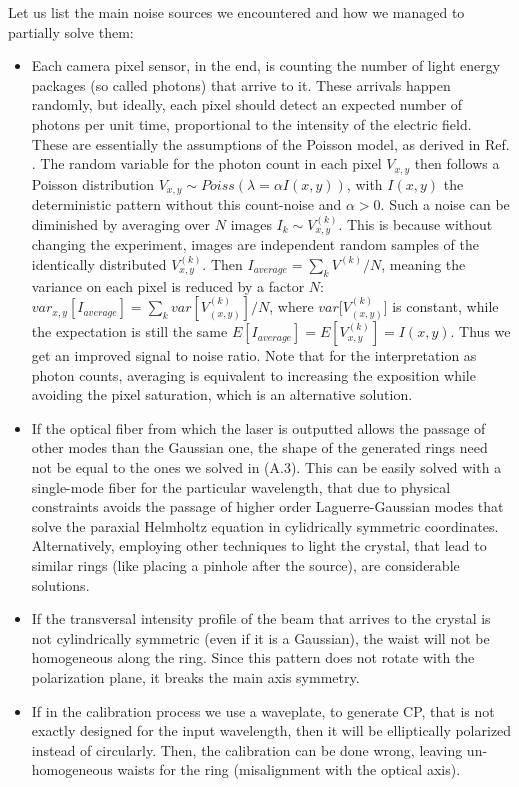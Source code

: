 \documentclass[11pt, a4paper, twoside]{article} %
\begin{document}
Let us list the main noise sources we encountered and how we managed to partially solve them:\vspace{-0.25cm}
\begin{itemize}
\item Each camera pixel sensor, in the end, is counting the number of light energy packages (so called photons) that arrive to it. These arrivals happen randomly, but ideally, each pixel should detect an expected number of photons per unit time, proportional to the intensity of the electric field. These are essentially the assumptions of the Poisson model, as derived in Ref. \cite{poisson}. The random variable for the photon count in each pixel $V_{x,y}$ then follows a Poisson distribution $V_{x,y}\sim Poiss(\lambda=\alpha I(x,y))$, with $I(x,y)$ the deterministic pattern without this count-noise and $\alpha>0$. Such a noise can be diminished by averaging over $N$ images $I_k\sim V^{(k)}_{x,y}$. This is because without changing the experiment, images are independent random samples of the identically distributed $V^{(k)}_{x,y}$. Then $I_{average}=\sum_{k}V^{(k)}/N$, meaning the variance on each pixel is reduced by a factor $N$: $var_{x,y}[I_{average}]=\sum_k var[V_{(x,y)}^{(k)}]/N$, where $var[V_{(x,y)}^{(k)}$] is constant, while the expectation is still the same $E[I_{average}]=E[V_{x,y}^{(k)}]=I(x,y)$. Thus we get an improved signal to noise ratio. Note that for the interpretation as photon counts, averaging is equivalent to increasing the exposition while avoiding the pixel saturation, which is an alternative solution.

\item If the optical fiber from which the laser is outputted allows the passage of other modes than the Gaussian one, the shape of the generated rings need not be equal to the ones we solved in (A.3). This can be easily solved with a single-mode fiber for the particular wavelength, that due to physical constraints avoids the passage of higher order Laguerre-Gaussian modes that solve the paraxial Helmholtz equation in cylidrically symmetric coordinates. Alternatively, employing other techniques to light the crystal, that lead to similar rings (like placing a pinhole after the source), are considerable solutions. \vspace{-0.1cm}

\item If the transversal intensity profile of the beam that arrives to the crystal is not cylindrically symmetric (even if it is a Gaussian), the waist will not be homogeneous along the ring. Since this pattern does not rotate with the polarization plane, it breaks the main axis symmetry.
\item If in the calibration process we use a waveplate, to generate CP, that is not exactly designed for the input wavelength, then it will be elliptically polarized instead of circularly. Then, the calibration can be done wrong, leaving un-homogeneous waists for the ring (misalignment with the optical axis).


\end{itemize}
\end{document}

